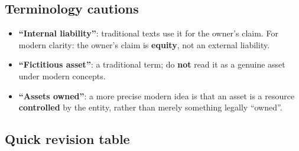 \documentclass[11pt,a4paper]{article}
\begin{document}
\subsection{Terminology cautions}

\begin{impbox}
\begin{itemize}
  \item \textbf{``Internal liability''}: traditional texts use it for the owner's claim. For modern clarity:
        the owner's claim is \textbf{equity}, not an external liability.
  \item \textbf{``Fictitious asset''}: a traditional term; do \textbf{not} read it as a genuine asset under modern concepts.
  \item \textbf{``Assets owned''}: a more precise modern idea is that an asset is a resource \textbf{controlled}
        by the entity, rather than merely something legally ``owned''.
\end{itemize}
\end{impbox}

\subsection{Quick revision table}
\end{document}
